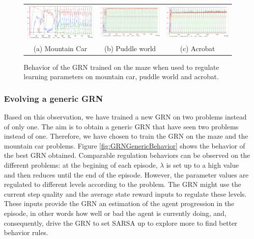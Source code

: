 \begin{figure}[t!]
\center
\begin{tabular}{ccc}
\includegraphics[width=0.32\linewidth]{MC_GRNMazeBehavior.pdf} &
\includegraphics[width=0.32\linewidth]{PW_GRNMazeBehavior.pdf} &
\includegraphics[width=0.32\linewidth]{ACP_GRNMazeBehavior.pdf} \\
(a) Mountain Car & (b) Puddle world & (c) Acrobat
\end{tabular}
\caption{Behavior of the GRN trained on the maze when used to regulate learning parameters on mountain car, puddle world and acrobat.}\label{fig:all:GRNMazeBehavior}
\end{figure}

\subsubsection{Evolving a generic GRN}
Based on this observation, we have trained a new GRN on two problems instead of only one. The aim is to obtain a generic GRN that have seen two problems instead of one. Therefore, we have chosen to train the GRN on the maze and the mountain car problems. Figure \ref{fig:GRNGenericBehavior} shows the behavior of the best GRN obtained. Comparable regulation behaviors can be observed on the different problems: at the begining of each episode, $\lambda$ is set up to a high value and then reduces until the end of the episode. However, the parameter values are regulated to different levels according to the problem. The GRN might use the current step quality and the average state reward inputs to regulate these levels. These inputs provide the GRN an estimation of the agent progression in the episode, in other words how well or bad the agent is currently doing, and, consequently, drive the GRN to set SARSA up to explore more to find better behavior rules.

